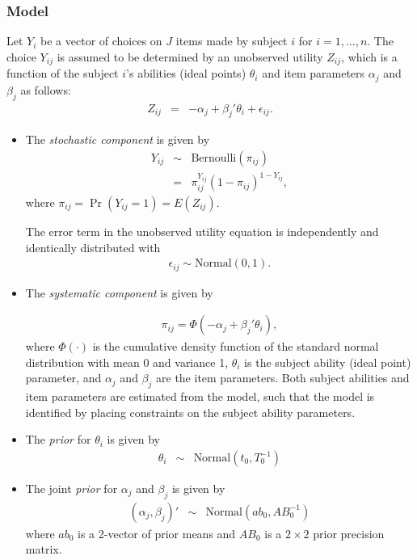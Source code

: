 \subsubsection{Model}

Let $Y_i$ be a vector of choices on $J$ items made by subject $i$ for
$i=1, \ldots, n$. The choice $Y_{ij}$ is assumed to be determined by
an unobserved utility $Z_{ij}$, which is a function of the subject $i$'s
abilities (ideal points) $\theta_i$ and item parameters $\alpha_j$ and
$\beta_j$ as follows:  
\begin{eqnarray*}
Z_{ij} &=& -\alpha_j + \beta_j' \theta_i + \epsilon_{ij}.
\end{eqnarray*}

\begin{itemize}
\item The \emph{stochastic component} is given by
\begin{eqnarray*}
Y_{ij}  &  \sim & \textrm{Bernoulli}(\pi_{ij}) \\
& = & \pi_{ij}^{Y_{ij}}(1-\pi_{ij})^{1-Y_{ij}},
\end{eqnarray*}
where $\pi_{ij}=\Pr(Y_{ij}=1)=E(Z_{ij})$.

The error term in the unobserved utility equation is independently
and identically distributed with 
\begin{eqnarray*}
\epsilon_{ij} \sim \textrm{Normal}(0, 1).
\end{eqnarray*}

\item The \emph{systematic component} is given by

\begin{eqnarray*}
\pi_{ij}= \Phi(-\alpha_j + \beta_j' \theta_i),
\end{eqnarray*}
where $\Phi(\cdot)$ is the cumulative density function of the standard
normal distribution with mean 0 and variance 1, $\theta_i$ is the
subject ability (ideal point) parameter, and $\alpha_j$ and $\beta_j$
are the item parameters. Both subject abilities and item parameters
are estimated from the model, such that the model is identified by
placing constraints on the subject ability parameters.

\item The \emph{prior} for $\theta_i$ is given by
\begin{eqnarray*}
\theta_i &\sim& \textrm{Normal} \left(  t_{0},T_{0}^{-1}\right)
\end{eqnarray*}

\item The joint \emph{prior} for $\alpha_j$ and $\beta_j$ is given by
\begin{eqnarray*}
(\alpha_j, \beta_j)' &\sim& \textrm{Normal}\left(  ab_{0},AB_{0}^{-1}\right)
\end{eqnarray*}
where $ab_0$ is a 2-vector of prior means and $AB_0$ is a $2 \times 2$ prior
precision matrix.

\end{itemize}
 
